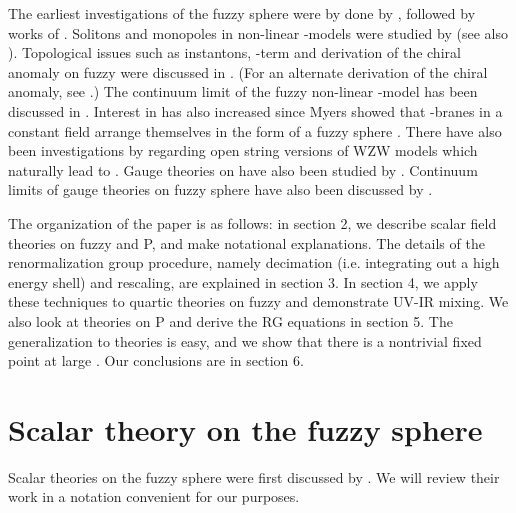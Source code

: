 \documentclass[a4paper,12pt]{article}
\numberwithin{equation}{section}
\begin{document}
The earliest investigations of the fuzzy sphere \coordHE{} were by done
by \cite{madore}, followed by works of \cite{gkp1,gkp2}. Solitons and
monopoles in non-linear \myHighlight{$\sigma$}\coordHE{}-models were studied by \cite{bbvy}
(see also \cite{gkp3}). Topological issues such as instantons,
\myHighlight{$\theta$}\coordHE{}-term and derivation of the chiral anomaly on fuzzy \coordHE{} were
discussed in \cite{balvai}. (For an alternate derivation of the chiral
anomaly, see \cite{presnajder}.) The continuum limit of the fuzzy
non-linear \myHighlight{$\sigma$}\coordHE{}-model has been discussed in
\cite{bamaoc}. Interest in \coordHE{} has also increased since Myers
showed that \coordHE{}-branes in a constant \coordHE{} field arrange themselves in
the form of a fuzzy sphere \cite{myers}. There have also been
investigations by \cite{alresc} regarding open string versions of WZW
models which naturally lead to \coordHE{}. Gauge theories on \coordHE{} have
also been studied by \cite{klimcik,watamura}. Continuum limits of
gauge theories on fuzzy sphere have also been discussed by
\cite{iktw}.

The organization of the paper is as follows: in section 2, we describe
scalar field theories on fuzzy \coordHE{} and \coordHE{}P\coordHE{}, and make
notational explanations. The details of the renormalization group
procedure, namely decimation (i.e. integrating out a high energy
shell) and rescaling, are explained in section 3. In section 4, we
apply these techniques to quartic theories on fuzzy \coordHE{} and
demonstrate UV-IR mixing. We also look at theories on \coordHE{}P\coordHE{} and derive the RG equations in section 5. The generalization
to \coordHE{} theories is easy, and we show that there is a nontrivial
fixed point at large \coordHE{}. Our conclusions are in section 6.

\section{Scalar theory on the fuzzy sphere}

Scalar theories on the fuzzy sphere were first discussed by
\cite{gkp1,gkp2}. We will review their work in a notation convenient
for our purposes.
 
\end{document}
